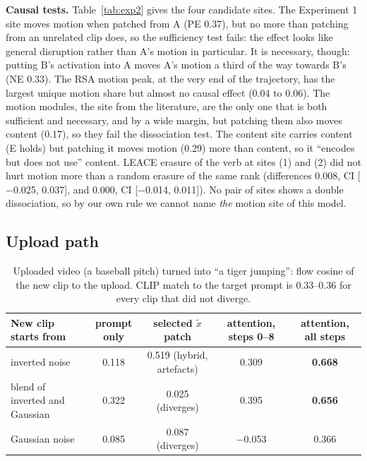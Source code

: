 \documentclass[twoside,english]{article}
\newcommand{\xd}{\tilde{x}}       %
\begin{document}
\textbf{Causal tests.} Table~\ref{tab:exp2} gives the four candidate sites. The Experiment 1 site moves
motion when patched from A (PE 0.37), but no more than patching from an unrelated clip does, so the
sufficiency test fails: the effect looks like general disruption rather than A's motion in particular. It is necessary, though: putting
B's activation into A moves A's motion a third of the way towards B's (NE 0.33). The RSA motion peak, at the very end of
the trajectory, has the largest unique motion share but almost no causal effect (0.04 to 0.06). The
 motion modules, the site from the literature, are the only one that is both
sufficient and necessary, and by a wide margin, but patching them also moves content (0.17), so they fail
the dissociation test. The content site carries content (E holds) but patching it moves motion (0.29) more
than content, so it ``encodes but does not use'' content. LEACE erasure of the verb at sites (1) and (2)
did not hurt motion more than a random erasure of the same rank (differences 0.008, CI [$-$0.025, 0.037],
and 0.000, CI [$-$0.014, 0.011]). No pair of sites shows a double dissociation, so by our own rule we
cannot name \emph{the} motion site of this model.

\subsection{Upload path} \label{sec:res_upload}

\begin{table}[!h]
\centering
\small
\begin{tabular}{lcccc}
\toprule
New clip starts from & prompt only & selected $\xd$ patch & attention, steps 0--8 & attention, all steps \\
\midrule
inverted noise & 0.118 & 0.519 (hybrid, artefacts) & 0.309 & \textbf{0.668} \\
blend of inverted and Gaussian & 0.322 & 0.025 (diverges) & 0.395 & \textbf{0.656} \\
Gaussian noise & 0.085 & 0.087 (diverges) & $-$0.053 & 0.366 \\
\bottomrule
\end{tabular}
\caption{Uploaded video (a baseball pitch) turned into ``a tiger jumping'': flow cosine of the new clip
to the upload. CLIP match to the target prompt is 0.33--0.36 for every clip that did not diverge.}
\label{tab:upload}
\end{table}
\end{document}
